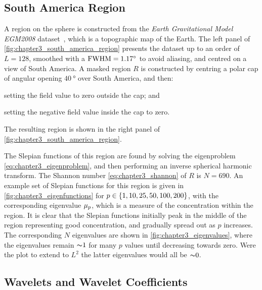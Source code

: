 \subsection{South America Region}\label{sec:chapter3_south_america_region}

A region on the sphere is constructed from the \emph{Earth Gravitational Model EGM2008} dataset~\cite{Pavlis2013}, which is a topographic map of the Earth.
The left panel of \cref{fig:chapter3_south_america_region} presents the dataset up to an order of \(L=128\), smoothed with a \(\text{FWHM}=\SI{1.17}{\degree}\) to avoid aliasing, and centred on a view of South America.
A masked region \(R\) is constructed by centring a polar cap of angular opening \(\SI{40}{\degree}\) over South America, and then:
%
\begin{inparaenum}[(i)]
	\item setting the field value to zero outside the cap; and
	\item setting the negative field value inside the cap to zero.
\end{inparaenum}
%
The resulting region is shown in the right panel of \cref{fig:chapter3_south_america_region}.



The Slepian functions of this region are found by solving the eigenproblem \cref{eq:chapter3_eigenproblem}, and then performing an inverse spherical harmonic transform.
The Shannon number \cref{eq:chapter3_shannon} of \(R\) is \(N=690\).
An example set of Slepian functions for this region is given in \cref{fig:chapter3_eigenfunctions} for \(p \in \{1, 10, 25, 50, 100, 200\}\), with the corresponding eigenvalue \({\mu}_{p}\), which is a measure of the concentration within the region.
It is clear that the Slepian functions initially peak in the middle of the region representing good concentration, and gradually spread out as \(p\) increases.
The corresponding \(N\) eigenvalues are shown in \cref{fig:chapter3_eigenvalues}, where the eigenvalues remain \({\thicksim}1\) for many \(p\) values until decreasing towards zero.
Were the plot to extend to \(L^{2}\) the latter eigenvalues would all be \({\thicksim}0\).





\subsection{Wavelets and Wavelet Coefficients}\label{sec:chapter3_south_america_wavelets}

